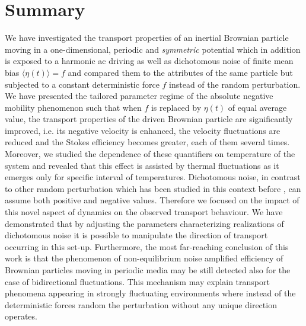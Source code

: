 \documentclass[12pt]{iopart}
\begin{document}
\section{Summary}
\label{sec5}
We have investigated the transport properties of an inertial Brownian particle moving in a one-dimensional, periodic and \emph{symmetric} potential which in addition is exposed to a harmonic ac driving as well as dichotomous noise of finite mean bias $\langle \eta(t) \rangle = f$ and compared them to the attributes of the same particle but subjected to a constant deterministic force $f$ instead of the random perturbation. 
We have presented the tailored parameter regime of the absolute negative mobility phenomenon such that when $f$ is replaced by $\eta(t)$ of equal average value, the transport properties of the driven Brownian particle are significantly improved, i.e. its negative velocity is enhanced, the velocity fluctuations are reduced and the Stokes efficiency becomes greater, each of them several times. Moreover, we studied the dependence of these quantifiers on  temperature of the system and 
revealed that this effect is assisted by  thermal fluctuations as it emerges only for specific interval of temperatures. Dichotomous noise, in contrast to other random perturbation which has been studied in this context before \cite{spiechPRE}, 
can assume both positive and negative values. Therefore we focused on the impact of this novel aspect of dynamics on the observed transport behaviour. We have demonstrated that by adjusting the parameters characterizing realizations of 
dichotomous noise it is possible to manipulate  the direction of transport occurring in this set-up. Furthermore, the most far-reaching conclusion of this work is that the 
phenomenon of non-equilibrium noise amplified efficiency of Brownian particles moving in periodic media may be still detected also for the case of bidirectional fluctuations. 
This mechanism may explain transport phenomena appearing in strongly fluctuating environments where instead of the deterministic forces random the perturbation without any unique direction operates.
\end{document}
